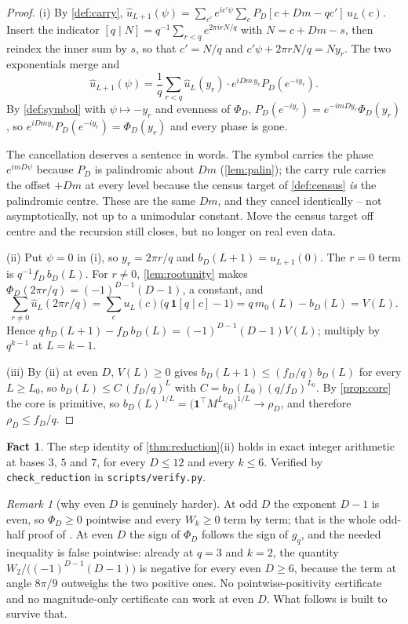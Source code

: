 \documentclass[11pt]{amsart}
\theoremstyle{definition}
\newtheorem{fact}[theorem]{Fact}
\theoremstyle{remark}
\newtheorem{remark}[theorem]{Remark}
\begin{document}
\begin{proof}
(i) By \cref{def:carry}, $\hat u_{L+1}(\psi) = \sum_{c'}e^{ic'\psi}\sum_c P_D[c + Dm - qc']\,u_L(c)$. Insert the indicator $[q \mid N] = q^{-1}\sum_{r<q}e^{2\pi i rN/q}$ with $N = c + Dm - s$, then reindex the inner sum by $s$, so that $c' = N/q$ and $c'\psi + 2\pi rN/q = Ny_r$. The two exponentials merge and
\[
  \hat u_{L+1}(\psi) = \frac1q\sum_{r<q}\hat u_L(y_r)\cdot e^{iDm\,y_r}P_D(e^{-iy_r}).
\]
By \cref{def:symbol} with $\psi \mapsto -y_r$ and evenness of $\Phi_D$, $P_D(e^{-iy_r}) = e^{-imDy_r}\Phi_D(y_r)$, so $e^{iDm y_r}P_D(e^{-iy_r}) = \Phi_D(y_r)$ and every phase is gone.

The cancellation deserves a sentence in words. The symbol carries the phase $e^{imD\psi}$ because $P_D$ is palindromic about $Dm$ (\cref{lem:palin}); the carry rule carries the offset $+Dm$ at every level because the census target of \cref{def:census} \emph{is} the palindromic centre. These are the same $Dm$, and they cancel identically -- not asymptotically, not up to a unimodular constant. Move the census target off centre and the recursion still closes, but no longer on real even data.

(ii) Put $\psi = 0$ in (i), so $y_r = 2\pi r/q$ and $b_D(L+1) = \hat u_{L+1}(0)$. The $r = 0$ term is $q^{-1}f_D\,b_D(L)$. For $r \ne 0$, \cref{lem:rootunity} makes $\Phi_D(2\pi r/q) = (-1)^{D-1}(D-1)$, a constant, and
\[
  \sum_{r \ne 0}\hat u_L(2\pi r/q) = \sum_c u_L(c)\bigl(q\,\mathbf 1[q \mid c] - 1\bigr) = q\,m_0(L) - b_D(L) = V(L).
\]
Hence $q\,b_D(L+1) - f_D\,b_D(L) = (-1)^{D-1}(D-1)V(L)$; multiply by $q^{k-1}$ at $L = k-1$.

(iii) By (ii) at even $D$, $V(L) \ge 0$ gives $b_D(L+1) \le (f_D/q)\,b_D(L)$ for every $L \ge L_0$, so $b_D(L) \le C\,(f_D/q)^L$ with $C = b_D(L_0)(q/f_D)^{L_0}$. By \cref{prop:core} the core is primitive, so $b_D(L)^{1/L} = \bigl(\mathbf 1^{\top}M^Le_0\bigr)^{1/L} \to \rho_D$, and therefore $\rho_D \le f_D/q$.
\end{proof}

\begin{fact}
\label{fact:reduction}
The step identity of \cref{thm:reduction}(ii) holds in exact integer arithmetic at bases $3$, $5$ and $7$, for every $D \le 12$ and every $k \le 6$. Verified by \texttt{check\_reduction} in \texttt{scripts/verify.py}.
\end{fact}

\begin{remark}[why even $D$ is genuinely harder]
\label{rem:obstruction}
At odd $D$ the exponent $D-1$ is even, so $\Phi_D \ge 0$ pointwise and every $W_k \ge 0$ term by term; that is the whole odd-half proof of \cite{slice-order}. At even $D$ the sign of $\Phi_D$ follows the sign of $g_q$, and the needed inequality is false pointwise: already at $q = 3$ and $k = 2$, the quantity $W_2/\bigl((-1)^{D-1}(D-1)\bigr)$ is negative for every even $D \ge 6$, because the term at angle $8\pi/9$ outweighs the two positive ones. No pointwise-positivity certificate and no magnitude-only certificate can work at even $D$. What follows is built to survive that.
\end{remark}
\end{document}
